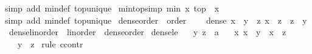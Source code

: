 \begin{isabellebody}
%
\endisadelimproof
%
\isatagproof
{}\isamarkupfalse%
{\isacharparenleft}{\kern0pt}simp\ add{\isacharcolon}{\kern0pt}\ min{\isacharunderscore}{\kern0pt}def\ top{\isacharunderscore}{\kern0pt}unique{\isacharparenright}{\kern0pt}%
\endisatagproof
{\isafoldproof}%
%
\isadelimproof
\isanewline
%
\endisadelimproof
\isanewline
{}\isamarkupfalse%
\ min{\isacharunderscore}{\kern0pt}top{}{\isacharbrackleft}{\kern0pt}simp{\isacharbrackright}{\kern0pt}{\isacharcolon}{\kern0pt}\ {\isachardoublequoteopen}min\ x\ top\ {\isacharequal}{\kern0pt}\ x{\isachardoublequoteclose}\isanewline
%
\isadelimproof
%
\endisadelimproof
%
\isatagproof
{}\isamarkupfalse%
{\isacharparenleft}{\kern0pt}simp\ add{\isacharcolon}{\kern0pt}\ min{\isacharunderscore}{\kern0pt}def\ top{\isacharunderscore}{\kern0pt}unique{\isacharparenright}{\kern0pt}%
\endisatagproof
{\isafoldproof}%
%
\isadelimproof
\isanewline
%
\endisadelimproof
\isanewline
{}\isamarkupfalse%
%
\isadelimdocument
%
\endisadelimdocument
%
\isatagdocument
%
\isamarkuptrue%
%
\endisatagdocument
{\isafolddocument}%
%
\isadelimdocument
%
\endisadelimdocument
{}\isamarkupfalse%
\ dense{\isacharunderscore}{\kern0pt}order\ {\isacharequal}{\kern0pt}\ order\ {\isacharplus}{\kern0pt}\isanewline
\ \ \ dense{\isacharcolon}{\kern0pt}\ {\isachardoublequoteopen}x\ {\isacharless}{\kern0pt}\ y\ {\isasymLongrightarrow}\ {\isacharparenleft}{\kern0pt}{\isasymexists}z{\isachardot}{\kern0pt}\ x\ {\isacharless}{\kern0pt}\ z\ {\isasymand}\ z\ {\isacharless}{\kern0pt}\ y{\isacharparenright}{\kern0pt}{\isachardoublequoteclose}\isanewline
\isanewline
{}\isamarkupfalse%
\ dense{\isacharunderscore}{\kern0pt}linorder\ {\isacharequal}{\kern0pt}\ linorder\ {\isacharplus}{\kern0pt}\ dense{\isacharunderscore}{\kern0pt}order\isanewline
{}\isanewline
\isanewline
{}\isamarkupfalse%
\ dense{\isacharunderscore}{\kern0pt}le{\isacharcolon}{\kern0pt}\isanewline
\ \ \ y\ z\ {\isacharcolon}{\kern0pt}{\isacharcolon}{\kern0pt}\ {\isacharprime}{\kern0pt}a\isanewline
\ \ \ {\isachardoublequoteopen}{\isasymAnd}x{\isachardot}{\kern0pt}\ x\ {\isacharless}{\kern0pt}\ y\ {\isasymLongrightarrow}\ x\ {\isasymle}\ z{\isachardoublequoteclose}\isanewline
\ \ \ {\isachardoublequoteopen}y\ {\isasymle}\ z{\isachardoublequoteclose}\isanewline
%
\isadelimproof
%
\endisadelimproof
%
\isatagproof
{}\isamarkupfalse%
\ {\isacharparenleft}{\kern0pt}rule\ ccontr{\isacharparenright}{\kern0pt}\isanewline

\end{isabellebody}
